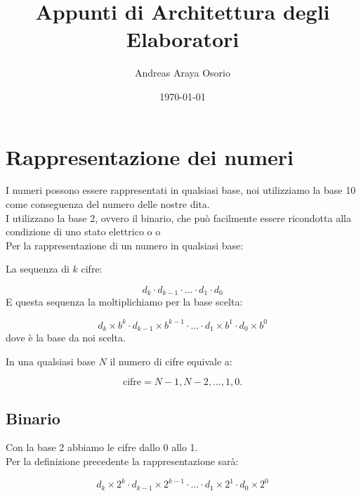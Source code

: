 \documentclass[12pt, a4paper]{article}
\title{Appunti di Architettura degli Elaboratori}
\author{Andreas Araya Osorio}
\date{\today}
\begin{document}
\maketitle



\section{Rappresentazione dei numeri}

I numeri possono essere rappresentati in qualsiasi base, noi utilizziamo la base
10 come conseguenza del numero delle nostre dita.\\
I  utilizzano la base 2, ovvero il binario, che può facilmente
essere ricondotta alla condizione di uno stato elettrico
o  o \\
Per la rappresentazione di un numero in qualsiasi base:
\begin{defn}
La sequenza di $k$ cifre:

\begin{equation}
	d_k \cdot d_{k-1} \cdot \dots \cdot d_1 \cdot d_0
\end{equation}
E questa sequenza la moltiplichiamo per la base scelta:

\begin{equation}
	d_k \times b^k \cdot d_{k-1} \times b^{k-1} \cdot 
	\dots \cdot d_1 \times b^1 \cdot d_0 \times b^0
\end{equation}
dove  è la base da noi scelta.
\end{defn}

\begin{defn}
In una qualsiasi base $N$ il numero di cifre equivale a:


\begin{equation}
	\mbox{cifre} = N - 1, N - 2, \dots, 1, 0.
\end{equation}
\end{defn}
\subsection{Binario}
Con la base 2 abbiamo le cifre dallo 0 allo 1.\\
Per la definizione precedente la rappresentazione sarà:


\begin{equation}
	d_k \times 2^k \cdot d_{k-1} \times 2^{k-1} \cdot 
	\dots \cdot d_1 \times 2^1 \cdot d_0 \times 2^0
\end{equation}
\end{document}
